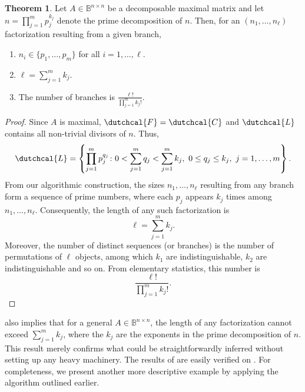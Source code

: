 \documentclass{article}
\numberwithin{equation}{section}
\theoremstyle{definition}
\newtheorem{theorem}[definition]{Theorem}
\begin{document}
\begin{theorem}
\label{th: maximal_mat}
Let $A \in \mathbb{B}^{n \times n}$ be a decomposable maximal matrix and let $n = \prod_{j=1}^m p_j^{k_j}$ denote the prime decomposition of $n$. Then, for an $(n_1,\dots,n_\ell)$ factorization resulting from a given branch,
\begin{enumerate}
    \item $n_i \in \{p_1,\dots,p_m\}$ for all $i=1,\dots,\ell$.
    \item $\ell = \sum_{j=1}^m k_j$.
    \item The number of branches is $\frac{\ell !}{\prod_{j=1}^m k_j!}$.
\end{enumerate}
\end{theorem}
\begin{proof}
Since $A$ is maximal, $\dutchcal{F}=\dutchcal{C}$ and $\dutchcal{L}$ contains all non-trivial divisors of $n$. Thus,
\begin{equation*}
    \dutchcal{L} = \left\{\prod_{j=1}^m p_j^{q_j} \colon 0 < \sum_{j=1}^m q_j < \sum_{j=1}^m k_j,\ 0 \leq q_j \leq k_j,\ j=1,\dots,m \right\}.
\end{equation*}
From our algorithmic construction, the sizes $n_1,\dots,n_\ell$ resulting from any branch form a sequence of prime numbers, where each $p_j$ appears $k_j$ times among $n_1,\dots,n_\ell$. Consequently, the length of any such factorization is
\begin{equation*}
    \ell = \sum_{j=1}^m k_j.
\end{equation*} 
Moreover, the number of distinct sequences (or branches) is the number of permutations of $\ell$ objects, among which $k_1$ are indistinguishable, $k_2$ are indistinguishable and so on. From elementary statistics, this number is
\begin{equation*}
    \frac{\ell !}{\prod_{j=1}^m k_j!}.
\end{equation*}
\end{proof}

 also implies that for a general $A \in \mathbb{B}^{n \times n}$, the length of any factorization cannot exceed $\sum_{j=1}^m k_j$, where the $k_j$ are the exponents in the prime decomposition of $n$. This result merely confirms what could be straightforwardly inferred without setting up any heavy machinery. The results of  are easily verified on . For completeness, we present another more descriptive example by applying the algorithm outlined earlier.
\end{document}
